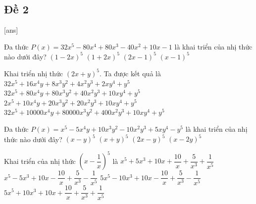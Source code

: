 \subsection{Đề 2}
[ans]
\caulc
\begin{ex}%
	Đa thức $P(x)=32x^5-80x^4+80x^3-40x^2+10x-1$ là khai triển của nhị thức nào dưới đây?
	\choice
	{$(1-2x)^5$}
	{$(1+2x)^5$}
	{\True $(2x-1)^5$}
	{$(x-1)^5$}
\end{ex}
\begin{ex}%
	Khai triển nhị thức $(2x+y)^5$. Ta được kết quả là
	\choice
	{$32x^5+16x^4y+8x^3y^2+4x^2y^3+2xy^4+y^5$}
	{\True $32x^5+80x^4y+80x^3y^2+40x^2y^3+10xy^4+y^5$}
	{$2x^5+10x^4y+20x^3y^2+20x^2y^3+10xy^4+y^5$}
	{$32x^5+10000x^4y+80000x^3y^2+400x^2y^3+10xy^4+y^5$}
\end{ex}
\begin{ex}%
	Đa thức $P(x)=x^5-5x^4y+10x^3y^2-10x^2y^3+5xy^4-y^5$ là khai triển của nhị thức nào dưới đây?
	\choice
	{\True $(x-y)^5$}
	{$(x+y)^5$}
	{$(2x-y)^5$}
	{$(x-2y)^5$}
\end{ex}
\begin{ex}%
	Khai triển của nhị thức $\left(x-\dfrac{1}{x}\right)^5$ là
	\choice
	{$x^5+5x^3+10x+\dfrac{10}{x}+\dfrac{5}{x^3}+\dfrac{1}{x^5}$}
	{\True $x^5-5x^3+10x-\dfrac{10}{x}+\dfrac{5}{x^3}-\dfrac{1}{x^5}$}
	{$5x^5-10x^3+10x-\dfrac{10}{x}+\dfrac{5}{x^3}-\dfrac{1}{x^5}$}
	{$5x^5+10x^3+10x+\dfrac{10}{x}+\dfrac{5}{x^3}+\dfrac{1}{x^5}$}
\end{ex}
